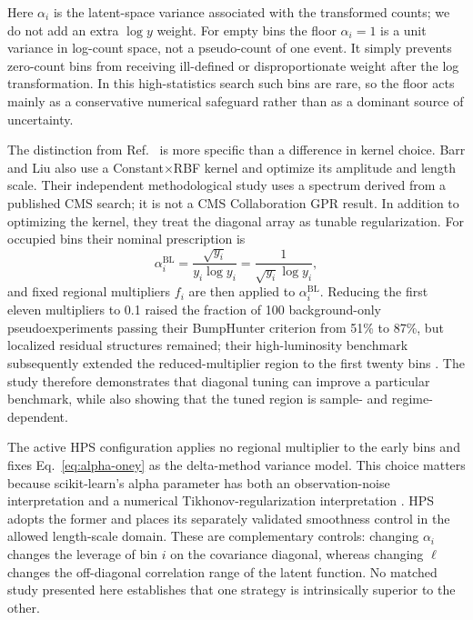 Here $\alpha_i$ is the latent-space variance associated with the transformed counts;
we do not add an extra $\log y$ weight. For empty bins the floor
$\alpha_i=1$ is a unit variance in log-count space, not a pseudo-count of one event. It
simply prevents zero-count bins from receiving ill-defined or disproportionate weight
after the log transformation. In this high-statistics search such bins are rare, so the
floor acts mainly as a conservative numerical safeguard rather than as a dominant
source of uncertainty.

The distinction from Ref.~\cite{BarrLiu2025} is more specific than a difference in
kernel choice. Barr and Liu also use a Constant$\times$RBF kernel and optimize its
amplitude and length scale. Their independent methodological study uses a spectrum
derived from a published CMS search; it is not a CMS Collaboration GPR result. In
addition to optimizing the kernel, they treat the diagonal array as tunable
regularization. For occupied bins their nominal prescription is
\begin{equation}
\alpha_i^{\mathrm{BL}}
= \frac{\sqrt{y_i}}{y_i\log y_i}
= \frac{1}{\sqrt{y_i}\log y_i},
\end{equation}
and fixed regional multipliers $f_i$ are then applied to
$\alpha_i^{\mathrm{BL}}$. Reducing the first eleven multipliers to 0.1 raised the
fraction of 100 background-only pseudoexperiments passing their BumpHunter criterion
from 51\% to 87\%, but localized residual structures remained; their high-luminosity
benchmark subsequently extended the reduced-multiplier region to the first twenty
bins \cite{BarrLiu2025}. The study therefore demonstrates that diagonal tuning can
improve a particular benchmark, while also showing that the tuned region is
sample- and regime-dependent.

The active HPS configuration applies no regional multiplier to the early bins and
fixes Eq.~\eqref{eq:alpha-oney} as the delta-method variance model. This choice matters
because scikit-learn's alpha parameter has both an observation-noise interpretation
and a numerical
Tikhonov-regularization interpretation \cite{ScikitLearnGPRDocs16}. HPS adopts the
former and places its separately validated smoothness control in the allowed
length-scale domain. These are complementary controls: changing $\alpha_i$ changes
the leverage of bin $i$ on the covariance diagonal, whereas changing $\ell$ changes
the off-diagonal correlation range of the latent function. No matched study presented
here establishes that one strategy is intrinsically superior to the other.

